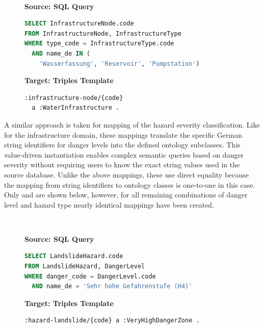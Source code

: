 \begin{figure}[ht!]
  \vspace*{-1mm}
  \textbf{\small{}} \\
  \begin{minipage}[t]{0.50\textwidth}
    \centering
    \textbf{\scriptsize Source: SQL Query}
\begin{lstlisting}[language=SQL]
SELECT InfrastructureNode.code
FROM InfrastructureNode, InfrastructureType
WHERE type_code = InfrastructureType.code
  AND name_de IN (
    'Wasserfassung', 'Reservoir', 'Pumpstation')
\end{lstlisting}
  \end{minipage}
  \hfill
  \begin{minipage}[t]{0.50\textwidth}
    \centering
    \textbf{\scriptsize Target: Triples Template}
\begin{lstlisting}[language=Turtle]
:infrastructure-node/{code}
  a :WaterInfrastructure . 
\end{lstlisting}
  \end{minipage}
  \vspace*{-4mm}
\end{figure}

A similar approach is taken for mapping of the hazard severity classification. Like for the infrastructure domain, these mappings translate the specific German string identifiers for danger levels into the defined ontology subclasses. This value-driven instantiation enables complex semantic queries based on danger severity without requiring users to know the exact string values used in the source database. Unlike the above mappings, these use direct equality because the mapping from string identifiers to ontology classes is one-to-one in this case. Only  and  are shown below, however, for all remaining combinations of danger level and hazard type  nearly identical mappings have been created.

\begin{figure}[ht!]
  \vspace*{-1mm}
  \textbf{\small{}} \\
  \begin{minipage}[t]{0.50\textwidth}
    \centering
    \textbf{\scriptsize Source: SQL Query}
\begin{lstlisting}[language=SQL]
SELECT LandslideHazard.code
FROM LandslideHazard, DangerLevel
WHERE danger_code = DangerLevel.code
  AND name_de = 'Sehr hohe Gefahrenstufe (H4)'
\end{lstlisting}
  \end{minipage}
  \hfill
  \begin{minipage}[t]{0.50\textwidth}
    \centering
    \textbf{\scriptsize Target: Triples Template}
\begin{lstlisting}[language=Turtle]
:hazard-landslide/{code} a :VeryHighDangerZone . 
\end{lstlisting}
  \end{minipage}
  \vspace*{-4mm}
\end{figure}

